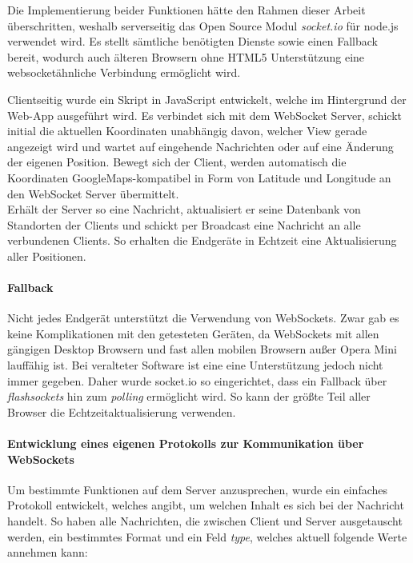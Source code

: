 Die Implementierung beider Funktionen hätte den Rahmen dieser Arbeit überschritten, weshalb serverseitig das Open Source Modul \emph{socket.io} \cite{socket.io} für node.js verwendet wird. Es stellt sämtliche benötigten Dienste sowie einen Fallback bereit, wodurch auch älteren Browsern ohne HTML5 Unterstützung eine websocketähnliche Verbindung ermöglicht wird.\par

Clientseitig wurde ein Skript in JavaScript entwickelt, welche im Hintergrund der Web-App ausgeführt wird. Es verbindet sich mit dem WebSocket Server, schickt initial die aktuellen Koordinaten unabhängig davon, welcher View gerade angezeigt wird und wartet auf eingehende Nachrichten oder auf eine Änderung der eigenen Position. Bewegt sich der Client, werden automatisch die Koordinaten GoogleMaps-kompatibel in Form von Latitude und Longitude an den WebSocket Server übermittelt.\\
Erhält der Server so eine Nachricht, aktualisiert er seine Datenbank von Standorten der Clients und schickt per Broadcast eine Nachricht an alle verbundenen Clients. So erhalten die Endgeräte in Echtzeit eine Aktualisierung aller Positionen.

\paragraph{Fallback}
Nicht jedes Endgerät unterstützt die Verwendung von WebSockets. Zwar gab es keine Komplikationen mit den getesteten Geräten, da WebSockets mit allen gängigen Desktop Browsern und fast allen mobilen Browsern außer Opera Mini lauffähig ist. Bei veralteter Software ist eine eine Unterstützung jedoch nicht immer gegeben. Daher wurde socket.io so eingerichtet, dass ein Fallback über \emph{flashsockets} hin zum \emph{polling} ermöglicht wird. So kann der größte Teil aller Browser die Echtzeitaktualisierung verwenden.

\paragraph{Entwicklung eines eigenen Protokolls zur Kommunikation über WebSockets}
Um bestimmte Funktionen auf dem Server anzusprechen, wurde ein einfaches Protokoll entwickelt, welches angibt, um welchen Inhalt es sich bei der Nachricht handelt. So haben alle Nachrichten, die zwischen Client und Server ausgetauscht werden, ein bestimmtes Format und ein Feld \emph{type}, welches aktuell folgende Werte annehmen kann:

